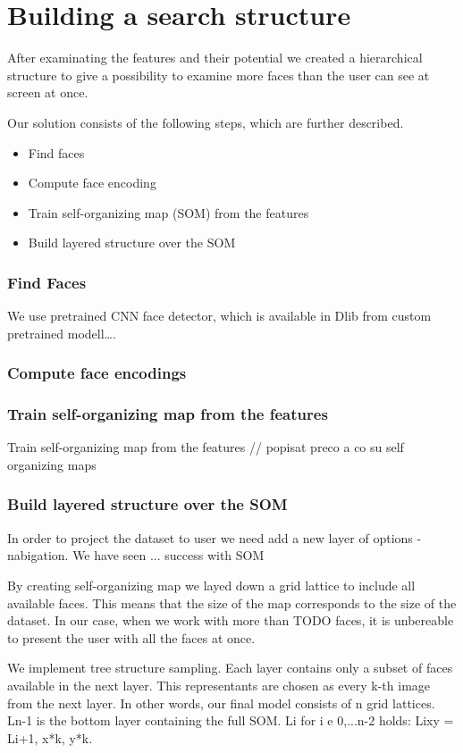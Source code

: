 \section{Building a search structure}

After examinating the features and their potential we created a hierarchical structure to give a possibility to examine more faces than the user can see at screen at once.


Our solution consists of the following steps, which are further described.
\begin{itemize}
    \item Find faces
    \item Compute face encoding
    \item Train self-organizing map (SOM) from the features
    \item Build layered structure over the SOM
\end{itemize}

\subsubsection*{Find Faces}
We use pretrained CNN face detector, which is available in Dlib from custom pretrained modell….


\subsubsection*{Compute face encodings}


\subsubsection*{Train self-organizing map from the features}
Train self-organizing map from the features
// popisat preco a co su self organizing maps



\subsubsection*{Build layered structure over the SOM}

In order to project the dataset to user we need add a new layer of options - nabigation. We have seen ... success with SOM 

By creating self-organizing map we layed down a grid lattice to include all available faces. This means that the size of the map corresponds to the size of the dataset. In our case, when we work with more than TODO faces, it is unbereable to present the user with all the faces at once.

We implement tree structure sampling. Each layer contains only a subset of faces available in the next layer. This representants are chosen as every k-th image from the next layer. In other words, our final model consists of n grid lattices. Ln-1 is the bottom layer containing the full SOM. Li for i e {0,...n-2} holds: Lixy = Li+1, x*k, y*k.
